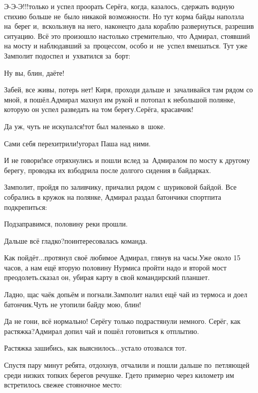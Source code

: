 \diagdash Э-Э-Э!!!\mdash только и успел проорать Серёга, когда, казалось, сдержать водную стихию больше не~было никакой возможности. Но тут корма байды наползла на~берег и,~вскользнув на него, наконец\sdash то дала кораблю развернуться, разрешив ситуацию. Всё это произошло настолько стремительно, что Адмирал, стоявший на мосту и наблюдавший за~процессом, особо и~не~успел вмешаться. Тут уже Замполит подоспел и~ухватился за~борт:

\diagdash Ну вы, блин, даёте!

\diagdash Забей, все живы, потерь нет! Киря, проходи дальше и~зачаливайся там рядом со мной, я пошёл.\mdash Адмирал махнул им рукой и потопал к небольшой полянке, которую он успел разведать на том берегу.\mdash Серёга, красавчик!

\diagdash Да уж, чуть не искупался!\mdash тот был маленько в~шоке.

\diagdash Сами себя перехитрили!\mdash угорал Паша над ними.

\diagdash И не говори!\mdash все отряхнулись и пошли вслед за~Адмиралом по мосту к другому берегу, проводка их взбодрила после долгого сидения в байдарках.

Замполит, пройдя по заливчику, причалил рядом с~шуриковой байдой. Все собрались в кружок на полянке, Адмирал раздал батончики спортпита подкрепиться:

\diagdash Подзаправимся, половину реки прошли.

\diagdash Дальше всё гладко?\mdash поинтересовалась команда.

\renewcommand*{\thefootnote}{\fnsymbol{footnote}}
\setcounter{footnote}{0}
\diagdash Как пойдёт$\ldots$\mdash протянул своё любимое Адмирал, глянув на часы.\mdash Уже около 15 часов, а нам ещё вторую половину Нурмиса пройти надо и второй мост преодолеть.\mdash сказал он, убирая карту в свой командирский планшет.

\diagdash Ладно, щас чаёк допьём и погнали.\mdash Замполит налил ещё чай из термоса и доел батончик.\mdash Чуть не утопили байду мою, блин!

\diagdash Да не гони, всё нормально! Серёгу только подрастянули немного. Серёг, как растяжка?\mdash Адмирал допил чай и пошёл готовиться к отплытию.

\diagdash Растяжка зашибись, как выяснилось$\ldots$\mdash устало отозвался тот.

Спустя пару минут ребята, отдохнув, отчалили и пошли дальше по~петляющей среди низких топких берегов речушке. Где\sdash то примерно через километр им встретилось свежее стояночное место:

